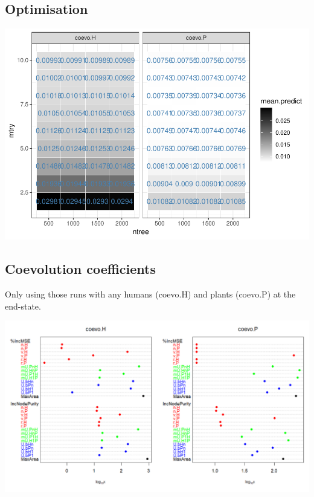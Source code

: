 \documentclass[
]{book}
\begin{document}
\hypertarget{optimisation}{%
\subsection{Optimisation}\label{optimisation}}

\includegraphics[width=1\linewidth]{hpcModel-exploration_files/figure-latex/5_RF.coevo.tunning-plot-1}

\newpage

\hypertarget{coevolution-coefficients}{%
\subsection{Coevolution coefficients}\label{coevolution-coefficients}}

Only using those runs with any humans (coevo.H) and plants (coevo.P) at the end-state.

\includegraphics[width=1\linewidth]{plots/5_multiplePar-RF-coevo}
\end{document}
